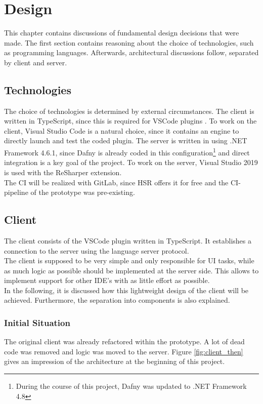 \section{Design}
\label{chapter:design}
This chapter contains discussions of fundamental design decisions that were made.
The first section contains reasoning about the choice of technologies, such as programming languages.
Afterwards, architectural discussions follow, separated by client and server.

\subsection{Technologies}
The choice of technologies is determined by external circumstances.
The client is written in TypeScript, since this is required for VSCode plugins \cite{vscodeAPI}.
To work on the client, Visual Studio Code is a natural choice, since it contains an engine to directly launch and test the coded plugin.
The server is written in \CsharpWithSpace using .NET Framework 4.6.1, since Dafny is already coded in this
configuration\footnote{During the course of this project, Dafny was updated to .NET Framework 4.8} and direct integration is a key goal of the project.
To work on the server, Visual Studio 2019 is used with the ReSharper extension.\\
The CI will be realized with GitLab, since HSR offers it for free and the CI-pipeline of the prototype was pre-existing.

\subsection{Client}
The client consists of the VSCode plugin written in TypeScript.
It establishes a connection to the server using the language server protocol.\\

The client is supposed to be very simple and only responsible for UI tasks, while as much logic as possible should be implemented at the server side.
This allows to implement support for other IDE's with as little effort as possible.\\

In the following, it is discussed how this lightweight design of the client will be achieved.
Furthermore, the separation into components is also explained.

\subsubsection{Initial Situation}
The original client was already refactored within the prototype.
A lot of dead code was removed and logic was moved to the server.
Figure \ref{fig:client_then} gives an impression of the architecture at the beginning of this project.

